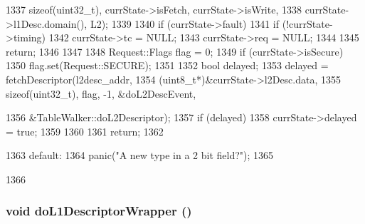 \begin{DoxyCode}
{{{1337                 sizeof(uint32_t), currState->isFetch, currState->isWrite,
1338                 currState->l1Desc.domain(), L2);
1339 
1340             if (currState->fault) {
1341                 if (!currState->timing) {
1342                     currState->tc = NULL;
1343                     currState->req = NULL;
1344                 }
1345                 return;
1346             }
1347 
1348             Request::Flags flag = 0;
1349             if (currState->isSecure)
1350                 flag.set(Request::SECURE);
1351 
1352             bool delayed;
1353             delayed = fetchDescriptor(l2desc_addr,
1354                                       (uint8_t*)&currState->l2Desc.data,
1355                                       sizeof(uint32_t), flag, -1, &doL2DescEvent,
      
1356                                       &TableWalker::doL2Descriptor);
1357             if (delayed) {
1358                 currState->delayed = true;
1359             }
1360 
1361             return;
1362         }
1363       default:
1364         panic("A new type in a 2 bit field?\n");
1365     }
1366 }
\end{DoxyCode}
\hypertarget{classArmISA_1_1TableWalker_a0498be5140a67703440d5ebdc2916173}{
\subsubsection[{doL1DescriptorWrapper}]{\setlength{\rightskip}{0pt plus 5cm}void doL1DescriptorWrapper ()}}
\label{classArmISA_1_1TableWalker_a0498be5140a67703440d5ebdc2916173}



